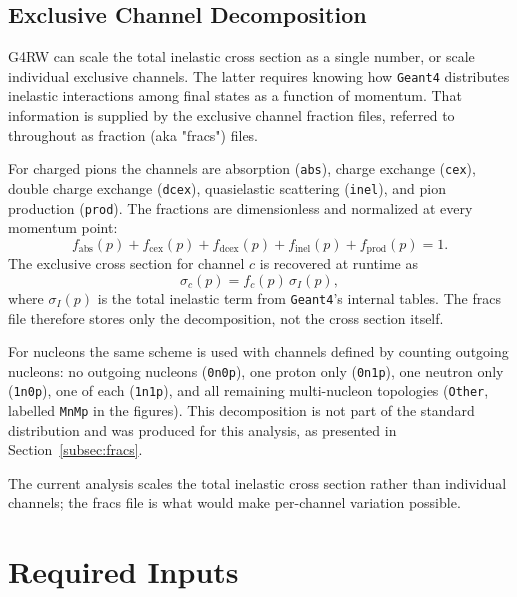 \documentclass[%
article,
nofootinbib
]{revtex4-2}
\DeclareRobustCommand{\gfour}{\texttt{Geant4}}
\begin{document}
\subsection{\label{subsec:exclusive}Exclusive Channel Decomposition}

G4RW can scale the total inelastic cross section as a single number, or scale
individual exclusive channels. The latter requires knowing how \gfour{}
distributes inelastic interactions among final states as a function of momentum.
That information is supplied by the exclusive channel fraction files, referred
to throughout as fraction (aka "fracs") files.

For charged pions the channels are absorption (\texttt{abs}), charge exchange
(\texttt{cex}), double charge exchange (\texttt{dcex}), quasielastic scattering
(\texttt{inel}), and pion production (\texttt{prod}). The fractions are
dimensionless and normalized at every momentum point:
\begin{equation}
\label{eq:fracs_sum}
f_{\text{abs}}(p) + f_{\text{cex}}(p) + f_{\text{dcex}}(p)
+ f_{\text{inel}}(p) + f_{\text{prod}}(p) = 1 .
\end{equation}
The exclusive cross section for channel $c$ is recovered at runtime as
\begin{equation}
\label{eq:exclusive_xsec}
\sigma_c(p) = f_c(p)\,\sigma_I(p),
\end{equation}
where $\sigma_I(p)$ is the total inelastic term from \gfour{}'s internal tables.
The fracs file therefore stores only the decomposition, not the cross section
itself.

For nucleons the same scheme is used with channels defined by counting
outgoing nucleons: no outgoing nucleons (\texttt{0n0p}), one proton only
(\texttt{0n1p}), one neutron only (\texttt{1n0p}), one of each
(\texttt{1n1p}), and all remaining multi-nucleon topologies (\texttt{Other},
labelled \texttt{MnMp} in the figures). This decomposition is not part of
the standard distribution and was produced for this analysis, as presented in Section~\ref{subsec:fracs}.

The current analysis scales the total inelastic cross section rather than
individual channels; the fracs file is what would make per-channel
variation possible.

\section{\label{sec:inputs}Required Inputs}
\end{document}
